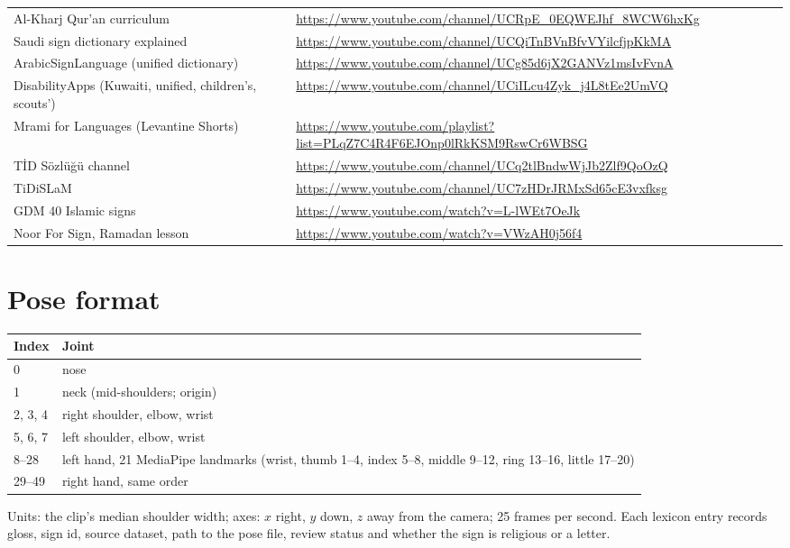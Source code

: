 \begin{longtable}{L{4.3cm} L{11.2cm}}
Al-Kharj Qur'an curriculum & \url{https://www.youtube.com/channel/UCRpE_0EQWEJhf_8WCW6hxKg} \\
Saudi sign dictionary explained & \url{https://www.youtube.com/channel/UCQiTnBVnBfvVYilcfjpKkMA} \\
ArabicSignLanguage (unified dictionary) & \url{https://www.youtube.com/channel/UCg85d6jX2GANVz1msIvFvnA} \\
DisabilityApps (Kuwaiti, unified, children's, scouts') & \url{https://www.youtube.com/channel/UCiILcu4Zyk_j4L8tEe2UmVQ} \\
Mrami for Languages (Levantine Shorts) & \url{https://www.youtube.com/playlist?list=PLqZ7C4R4F6EJOnp0lRkKSM9RswCr6WBSG} \\
T\.{I}D S\"ozl\"u\u{g}\"u channel & \url{https://www.youtube.com/channel/UCq2tlBndwWjJb2Zlf9QoOzQ} \\
TiDiSLaM & \url{https://www.youtube.com/channel/UC7zHDrJRMxSd65cE3vxfksg} \\
GDM 40 Islamic signs & \url{https://www.youtube.com/watch?v=L-lWEt7OeJk} \\
Noor For Sign, Ramadan lesson & \url{https://www.youtube.com/watch?v=VWzAH0j56f4} \\
\bottomrule
\end{longtable}

\chapter{Pose format}
\label{app:pose}
\begin{tabular}{l p{13cm}}
\toprule
Index & Joint \\
\midrule
0 & nose \\
1 & neck (mid-shoulders; origin) \\
2, 3, 4 & right shoulder, elbow, wrist \\
5, 6, 7 & left shoulder, elbow, wrist \\
8--28 & left hand, 21 MediaPipe landmarks (wrist, thumb 1--4, index 5--8, middle 9--12, ring 13--16, little 17--20) \\
29--49 & right hand, same order \\
\bottomrule
\end{tabular}

\noindent Units: the clip's median shoulder width; axes: $x$ right, $y$ down, $z$ away from the camera; 25 frames per
second. Each lexicon entry records gloss, sign id, source dataset, path to the pose file, review status and whether the
sign is religious or a letter.

